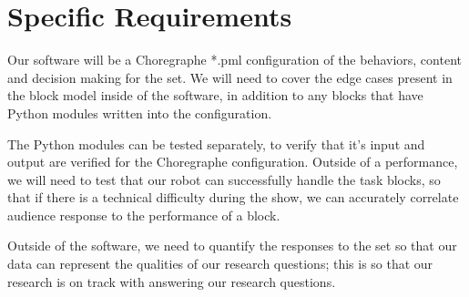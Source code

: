 \documentclass[onecolumn, draftclsnofoot,10pt, compsoc]{IEEEtran}
\begin{document}
\section{Specific Requirements}

Our software will be a Choregraphe *.pml configuration of the behaviors, content and decision making for the set. We will need to cover the edge cases present in the block model inside of the software, in addition to any blocks that have Python modules written into the configuration.

	The Python modules can be tested separately, to verify that it’s input and output are verified for the Choregraphe configuration. Outside of a performance, we will need to test that our robot can successfully handle the task blocks, so that if there is a technical difficulty during the show, we can accurately correlate audience response to the performance of a block.

	Outside of the software, we need to quantify the responses to the set so that our data can represent the qualities of our research questions; this is so that our research is on track with answering our research questions.




% 
% 
\end{document}
